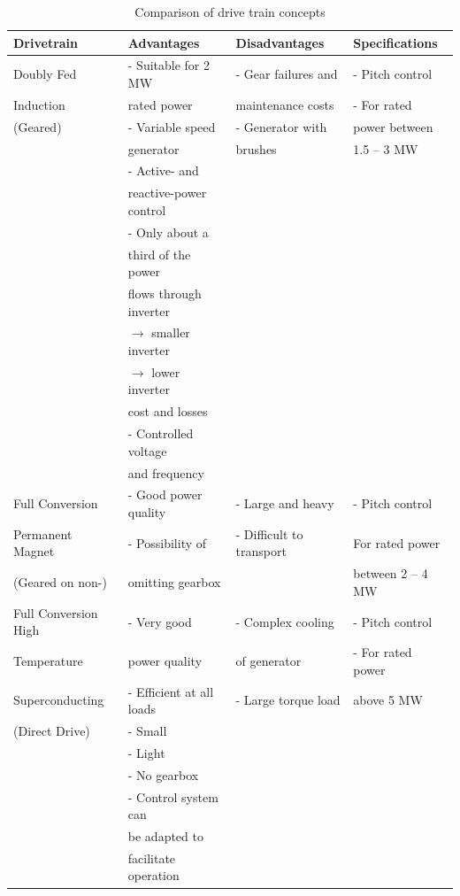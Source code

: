 \begin{table}[H]
\label{tab:comparison_dt}
\hspace*{-2.cm}
\centering
\caption{Comparison of drive train concepts}
\begin{tabular}{ |l|l|l|l| }
 \hline
 \textbf{Drivetrain} & \textbf{Advantages} & \textbf{Disadvantages} & \textbf{Specifications} \\ 
 \hline
 Doubly Fed & - Suitable for 2 MW & - Gear failures and & - Pitch control\\ 
  Induction & rated power &  maintenance costs & - For rated\\ 
 (Geared) & - Variable speed & - Generator with & power between\\
  & generator & brushes & 1.5 – 3 MW\\
  & - Active- and & & \\
  & reactive-power control & &\\
  & - Only about a &  & \\
  & third of the power &  & \\
  & flows through inverter & & \\
  & $\to$ smaller inverter & & \\
  & $\to$ lower inverter & & \\
  & cost and losses & & \\
  & - Controlled voltage & & \\
  & and frequency & & \\
  \hline
  Full Conversion & - Good power quality & - Large and heavy & - Pitch control\\
  Permanent Magnet & - Possibility of & - Difficult to transport & For rated power \\
  (Geared on non-) & omitting gearbox & & between 2 – 4 MW \\
  \hline
 Full Conversion High & - Very good & - Complex cooling & - Pitch control\\
 Temperature & power quality & of generator & - For rated power\\
 Superconducting & - Efficient at all loads & - Large torque load & above 5 MW\\
 (Direct Drive) & - Small & & \\
  & - Light & & \\
  & - No gearbox & & \\
  & - Control system can & & \\
  & be adapted to & & \\
  & facilitate operation & & \\

\end{tabular}
\end{table}
